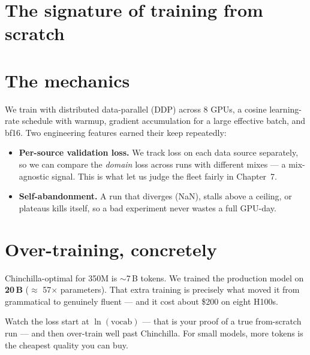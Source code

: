 \section{The signature of training from scratch}

\section{The mechanics}
We train with distributed data-parallel (DDP) across 8 GPUs, a cosine learning-rate schedule with warmup,
gradient accumulation for a large effective batch, and bf16. Two engineering features earned their keep
repeatedly:

\begin{itemize}
  \item \textbf{Per-source validation loss.} We track loss on each data source separately, so we can compare
  the \emph{domain} loss across runs with different mixes --- a mix-agnostic signal. This is what let us judge
  the fleet fairly in Chapter~7.
  \item \textbf{Self-abandonment.} A run that diverges (NaN), stalls above a ceiling, or plateaus kills itself,
  so a bad experiment never wastes a full GPU-day.
\end{itemize}

\section{Over-training, concretely}
Chinchilla-optimal for 350M is $\sim$7\,B tokens. We trained the production model on \textbf{20\,B} ($\approx$
57$\times$ parameters). That extra training is precisely what moved it from grammatical to genuinely fluent ---
and it cost about \$200 on eight H100s.

\begin{lesson}
Watch the loss start at $\ln(\text{vocab})$ --- that is your proof of a true from-scratch run --- and then
over-train well past Chinchilla. For small models, more tokens is the cheapest quality you can buy.
\end{lesson}

